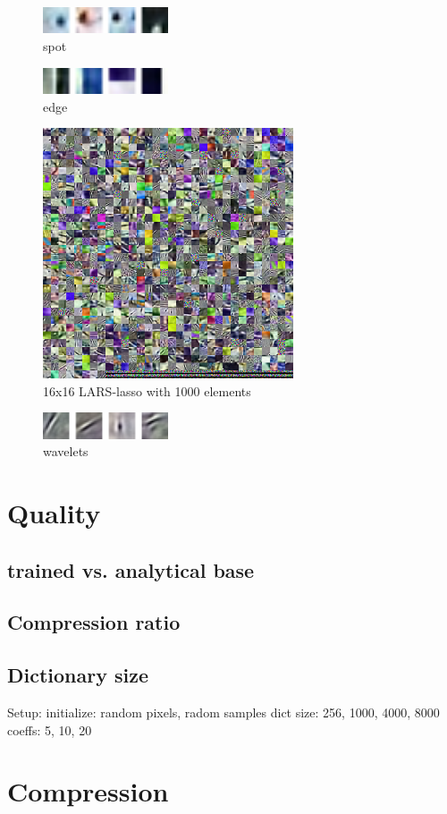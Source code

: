 \begin{figure}
\centering
\includegraphics[width = 0.33\textwidth]{images/spot.png} 
\caption{spot}
\label{fig:spot}
\end{figure}


\begin{figure}
\centering
\includegraphics[width = 0.33\textwidth]{images/edges.png}
\caption{edge}
\label{fig:edge}
\end{figure}

\begin{figure}
\centering
\includegraphics[width = 0.66\textwidth]{images/16_1000_1000_10_lasso.png}
\caption{16x16 LARS-lasso with 1000 elements}
\label{fig:16_1000_lasso}
\end{figure}

\begin{figure}
\centering
\includegraphics[width = 0.33\textwidth]{images/wavelet.png}
\caption{wavelets}
\label{fig:wavelets}
\end{figure}

\section{Quality}
\subsection*{trained vs. analytical base}
\subsection*{Compression ratio}
\subsection*{Dictionary size}
Setup:
  initialize: random pixels, radom samples 
  dict size: 256, 1000, 4000, 8000
  coeffs: 5, 10, 20

\section{Compression}







